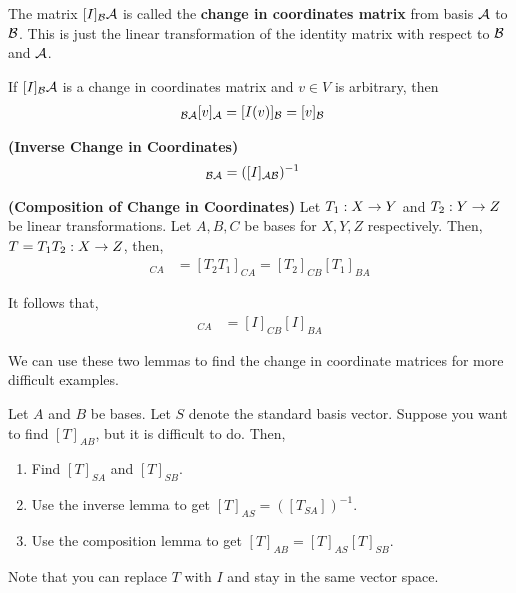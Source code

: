 \begin{definition}
    The matrix $[I]_{\mathcal{B}}\mathcal{A}$ is called the \textbf{change in coordinates matrix} from basis $\mathcal{A}$ to $\mathcal{B}$. This is just the linear transformation of the
    identity matrix with respect to $\mathcal{B}$ and $\mathcal{A}$.
\end{definition}

\begin{corollary}
    If $[I]_{\mathcal{B}}\mathcal{A}$ is a change in coordinates matrix and $v \in V$ is arbitrary, then
    \begin{align*}
        [I]_{\cB\cA} [v]_\cA &= [I(v)]_\cB = [v]_\cB
    \end{align*}
\end{corollary}

\begin{lemma} \textbf{(Inverse Change in Coordinates)}
    \begin{align*}
        [I]_{\cB\cA} &= ([I]_{\cA\cB})^{-1}
    \end{align*}
\end{lemma}

\begin{lemma} \textbf{(Composition of Change in Coordinates)}
    Let $T_1 : X \rightarrow Y$ and $T_2 : Y \rightarrow Z$ be linear transformations. Let $A, B, C$ be bases for $X, Y, Z$ 
    respectively. Then, $T  = T_1 T_2: X \rightarrow Z$, then,
    \begin{align*}
        [T]_{CA} &= [T_2 T_1]_{CA} = [T_2]_{CB} [T_1]_{BA}
    \end{align*}
\end{lemma}

\begin{corollary}
    It follows that,
    \begin{align*}
        [I]_{CA} &= [I]_{CB} [I]_{BA}
    \end{align*}
\end{corollary}

We can use these two lemmas to find the change in coordinate matrices for more difficult examples.
\begin{strat}
    Let $A$ and $B$ be bases. Let $S$ denote the standard basis vector. Suppose you want to find $[T]_{AB}$, but it is difficult to do. Then,
    \begin{enumerate}
        \item Find $[T]_{SA}$ and $[T]_{SB}$.
        \item Use the inverse lemma to get $[T]_{AS} = ([T_{SA}])^{-1}$.
        \item Use the composition lemma to get $[T]_{AB} = [T]_{AS} [T]_{SB}$.
    \end{enumerate}
    Note that you can replace $T$ with $I$ and stay in the same vector space.
\end{strat}

